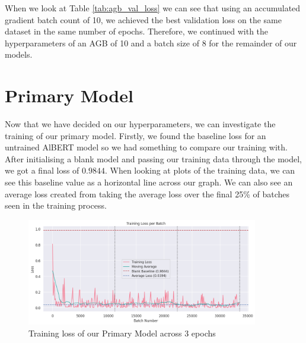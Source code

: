 When we look at Table \ref{tab:agb_val_loss} we can see that using an accumulated gradient batch count of 10, we achieved the best validation loss on the same dataset in the same number of epochs. Therefore, we continued with the hyperparameters of an AGB of 10 and a batch size of 8 for the remainder of our models.

\section{Primary Model}

Now that we have decided on our hyperparameters, we can investigate the training of our primary model. Firstly, we found the baseline loss for an untrained AlBERT model so we had something to compare our training with. After initialising a blank model and passing our training data through the model, we got a final loss of $0.9844$. When looking at plots of the training data, we can see this baseline value as a horizontal line across our graph. We can also see an average loss created from taking the average loss over the final 25\% of batches seen in the training process.

\begin{figure}[H]
    \centering
    \includegraphics[width=0.9\textwidth]{graphs/training/accumulated_grad_batch/agb-10_training_loss.png}
    \caption{Training loss of our Primary Model across 3 epochs}
    \label{fig:agb_10_train}
\end{figure}

